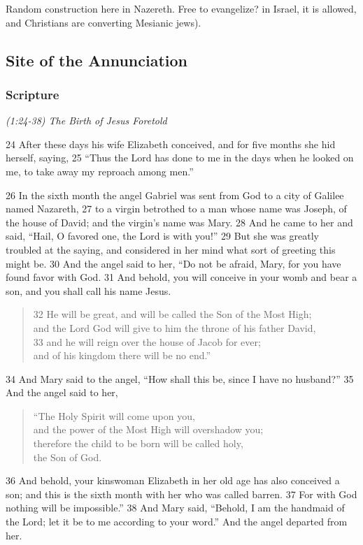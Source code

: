 \documentclass[letterpaper]{report}
\begin{document}
Random construction here in Nazereth.  Free to evangelize? in Israel, it is allowed, and Christians are converting Mesianic jews).


\clearpage
\subsection{Site of the Annunciation}
\begin{multicols}{2}
	\mbox{}
\end{multicols}
\subsubsection{Scripture}

{\centering
	\emph{(1:24-38) The Birth of Jesus Foretold}\\
}
\begin{multicols}{2}
24 After these days his wife Elizabeth conceived, and for five months she hid herself, saying, 25 “Thus the Lord has done to me in the days when he looked on me, to take away my reproach among men.”

26 In the sixth month the angel Gabriel was sent from God to a city of Galilee named Nazareth, 27 to a virgin betrothed to a man whose name was Joseph, of the house of David; and the virgin’s name was Mary. 28 And he came to her and said, “Hail, O favored one, the Lord is with you!” 29 But she was greatly troubled at the saying, and considered in her mind what sort of greeting this might be. 30 And the angel said to her, “Do not be afraid, Mary, for you have found favor with God. 31 And behold, you will conceive in your womb and bear a son, and you shall call his name Jesus.

\begin{verse}
32 He will be great, and will be called the Son of the Most High;\\
and the Lord God will give to him the throne of his father David,\\
33 and he will reign over the house of Jacob for ever;\\
and of his kingdom there will be no end.”\\
\end{verse}

34 And Mary said to the angel, “How shall this be, since I have no husband?” 35 And the angel said to her,

\begin{verse}
“The Holy Spirit will come upon you,\\
and the power of the Most High will overshadow you;\\
therefore the child to be born will be called holy,\\
the Son of God.\\
\end{verse}
36 And behold, your kinswoman Elizabeth in her old age has also conceived a son; and this is the sixth month with her who was called barren. 37 For with God nothing will be impossible.” 38 And Mary said, “Behold, I am the handmaid of the Lord; let it be to me according to your word.” And the angel departed from her.

\end{multicols}
\end{document}
